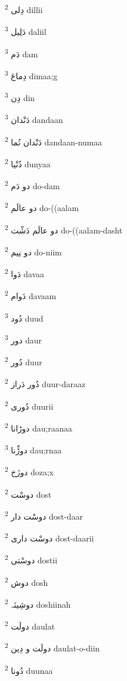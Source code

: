 \documentclass[12pt]{article}
\begin{document}
\begin{multicols}{5}
{\ur دِلی}   \textsuperscript{2} dillii

{\ur دَلِیل}   \textsuperscript{3} daliil

{\ur دَم}   \textsuperscript{3} dam

{\ur دِماغ}   \textsuperscript{3} dimaa;g

{\ur دِن}   \textsuperscript{3} din

{\ur دَنْدان}   \textsuperscript{3} dandaan

{\ur دَنْدان نُما}   \textsuperscript{2} dandaan-numaa

{\ur دُنْیا}   \textsuperscript{2} dunyaa

{\ur دو دَم}   \textsuperscript{2} do-dam

{\ur دو عالَم}   \textsuperscript{2} do-((aalam

{\ur دو عالَم دَشْت}   \textsuperscript{2} do-((aalam-dasht

{\ur دو نِیم}   \textsuperscript{2} do-niim

{\ur دَوا}   \textsuperscript{2} davaa

{\ur دَوام}   \textsuperscript{2} davaam

{\ur دُود}   \textsuperscript{3} duud

{\ur دور}   \textsuperscript{3} daur

{\ur دُور}   \textsuperscript{2} duur

{\ur دُور دَراز}   \textsuperscript{2} duur-daraaz

{\ur دُوری}   \textsuperscript{2} duurii

{\ur دوڑانا}   \textsuperscript{2} dau;raanaa

{\ur دوڑْنا}   \textsuperscript{3} dau;rnaa

{\ur دوزَخ}   \textsuperscript{2} doza;x

{\ur دوسْت}   \textsuperscript{2} dost

{\ur دوسْت دار}   \textsuperscript{2} dost-daar

{\ur دوسْت داری}   \textsuperscript{2} dost-daarii

{\ur دوسْتی}   \textsuperscript{2} dostii

{\ur دوش}   \textsuperscript{2} dosh

{\ur دوشِینَہ}   \textsuperscript{2} doshiinah

{\ur دولَت}   \textsuperscript{2} daulat

{\ur دولَت و دِین}   \textsuperscript{2} daulat-o-diin

{\ur دُونا}   \textsuperscript{2} duunaa


\end{multicols}
\end{document}
